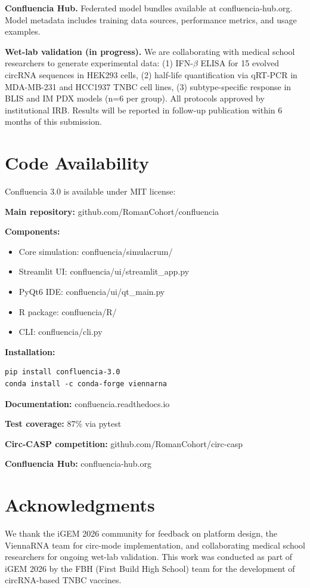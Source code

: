 \documentclass[12pt]{article}
\begin{document}
\textbf{Confluencia Hub.} Federated model bundles available at confluencia-hub.org. Model metadata includes training data sources, performance metrics, and usage examples.

\textbf{Wet-lab validation (in progress).} We are collaborating with medical school researchers to generate experimental data: (1) IFN-$\beta$ ELISA for 15 evolved circRNA sequences in HEK293 cells, (2) half-life quantification via qRT-PCR in MDA-MB-231 and HCC1937 TNBC cell lines, (3) subtype-specific response in BLIS and IM PDX models (n=6 per group). All protocols approved by institutional IRB. Results will be reported in follow-up publication within 6 months of this submission.

\section{Code Availability}

Confluencia 3.0 is available under MIT license:

\textbf{Main repository:} github.com/RomanCohort/confluencia

\textbf{Components:}
\begin{itemize}
\item Core simulation: confluencia/simulacrum/
\item Streamlit UI: confluencia/ui/streamlit\_app.py
\item PyQt6 IDE: confluencia/ui/qt\_main.py
\item R package: confluencia/R/
\item CLI: confluencia/cli.py
\end{itemize}

\textbf{Installation:}
\begin{verbatim}
pip install confluencia-3.0
conda install -c conda-forge viennarna
\end{verbatim}

\textbf{Documentation:} confluencia.readthedocs.io

\textbf{Test coverage:} 87\% via pytest

\textbf{Circ-CASP competition:} github.com/RomanCohort/circ-casp

\textbf{Confluencia Hub:} confluencia-hub.org

\section{Acknowledgments}

We thank the iGEM 2026 community for feedback on platform design, the ViennaRNA team for circ-mode implementation, and collaborating medical school researchers for ongoing wet-lab validation. This work was conducted as part of iGEM 2026 by the FBH (First Build High School) team for the development of circRNA-based TNBC vaccines.



\end{document}
